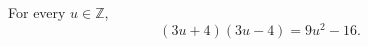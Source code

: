 \documentclass{article}
\begin{document}
\begin{proposition}\label{hold:factor}
For every $u\in\mathbb{Z}$,
\[(3u+4)(3u-4)=9u^2-16.\]
\end{proposition}
\end{document}
